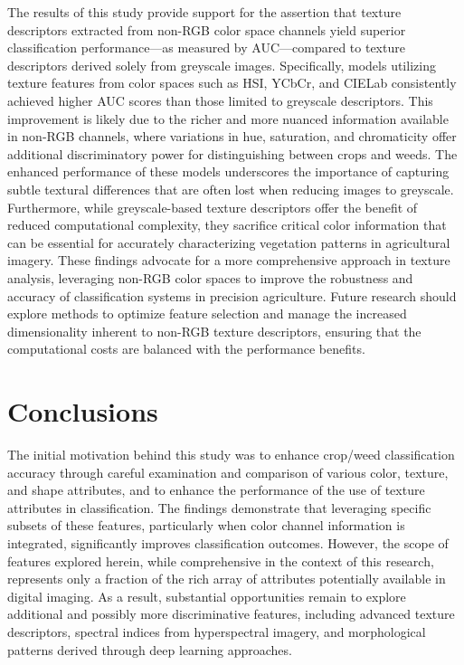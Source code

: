 \documentclass[letterpaper, notitlepage]{report}
\begin{document}
The results of this study provide support for the assertion that texture descriptors extracted from non-RGB color space channels yield superior classification performance—as measured by AUC—compared to texture descriptors derived solely from greyscale images. Specifically, models utilizing texture features from color spaces such as HSI, YCbCr, and CIELab consistently achieved higher AUC scores than those limited to greyscale descriptors. This improvement is likely due to the richer and more nuanced information available in non-RGB channels, where variations in hue, saturation, and chromaticity offer additional discriminatory power for distinguishing between crops and weeds. The enhanced performance of these models underscores the importance of capturing subtle textural differences that are often lost when reducing images to greyscale. Furthermore, while greyscale-based texture descriptors offer the benefit of reduced computational complexity, they sacrifice critical color information that can be essential for accurately characterizing vegetation patterns in agricultural imagery. These findings advocate for a more comprehensive approach in texture analysis, leveraging non-RGB color spaces to improve the robustness and accuracy of classification systems in precision agriculture. Future research should explore methods to optimize feature selection and manage the increased dimensionality inherent to non-RGB texture descriptors, ensuring that the computational costs are balanced with the performance benefits.



\section{Conclusions}
The initial motivation behind this study was to enhance crop/weed classification accuracy through careful examination and comparison of various color, texture, and shape attributes, and to enhance the performance of the use of texture attributes in classification. The findings demonstrate that leveraging specific subsets of these features, particularly when color channel information is integrated, significantly improves classification outcomes. However, the scope of features explored herein, while comprehensive in the context of this research, represents only a fraction of the rich array of attributes potentially available in digital imaging. As a result, substantial opportunities remain to explore additional and possibly more discriminative features, including advanced texture descriptors, spectral indices from hyperspectral imagery, and morphological patterns derived through deep learning approaches.
\end{document}
